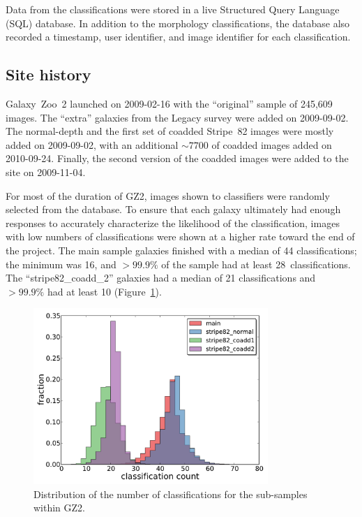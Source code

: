 \documentclass[useAMS,usenatbib]{mn2e}
\begin{document}
Data from the classifications were stored in a live Structured Query Language (SQL) database. In addition to the morphology classifications, the database also recorded a timestamp, user identifier, and image identifier for each classification. 

\subsection{Site history}\label{ssec-site_history}

Galaxy~Zoo~2 launched on 2009-02-16 with the ``original'' sample of 245,609 images. The ``extra'' galaxies from the Legacy survey were added on 2009-09-02. The normal-depth and the first set of coadded Stripe~82 images were mostly added on 2009-09-02, with an additional $\sim7700$ of coadded images added on 2010-09-24. Finally, the second version of the coadded images were added to the site on 2009-11-04. 

For most of the duration of GZ2, images shown to classifiers were randomly selected from the database. To ensure that each galaxy ultimately had enough responses to accurately characterize the likelihood of the classification, images with low numbers of classifications were shown at a higher rate toward the end of the project. The main sample galaxies finished with a median of 44 classifications; the minimum was 16, and $>99.9\%$ of the sample had at least 28~classifications. The ``stripe82\_coadd\_2'' galaxies had a median of 21 classifications and $>99.9\%$ had at least 10 (Figure~\ref{fig-classification_histogram}).

\begin{figure}
\includegraphics[angle=0,width=3.5in]{figures/classification_histogram.pdf}
\caption{Distribution of the number of classifications for the sub-samples within GZ2.
\label{fig-classification_histogram}}
\end{figure}
\end{document}
